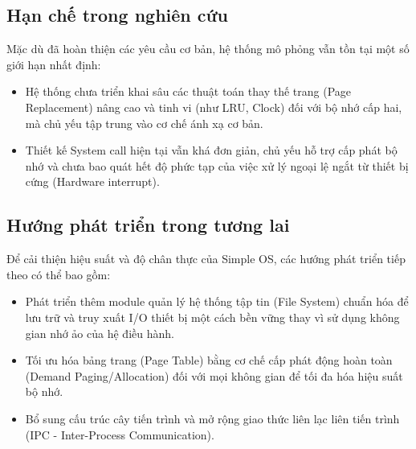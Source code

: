 \documentclass[a4paper]{article}
\begin{document}
\subsection{Hạn chế trong nghiên cứu}
Mặc dù đã hoàn thiện các yêu cầu cơ bản, hệ thống mô phỏng vẫn tồn tại một số giới hạn nhất định:
\begin{itemize}
    \item Hệ thống chưa triển khai sâu các thuật toán thay thế trang (Page Replacement) nâng cao và tinh vi (như LRU, Clock) đối với bộ nhớ cấp hai, mà chủ yếu tập trung vào cơ chế ánh xạ cơ bản.
    \item Thiết kế System call hiện tại vẫn khá đơn giản, chủ yếu hỗ trợ cấp phát bộ nhớ và chưa bao quát hết độ phức tạp của việc xử lý ngoại lệ ngắt từ thiết bị cứng (Hardware interrupt).
\end{itemize}

\subsection{Hướng phát triển trong tương lai}
Để cải thiện hiệu suất và độ chân thực của Simple OS, các hướng phát triển tiếp theo có thể bao gồm:
\begin{itemize}
    \item Phát triển thêm module quản lý hệ thống tập tin (File System) chuẩn hóa để lưu trữ và truy xuất I/O thiết bị một cách bền vững thay vì sử dụng không gian nhớ ảo của hệ điều hành.
    \item Tối ưu hóa bảng trang (Page Table) bằng cơ chế cấp phát động hoàn toàn (Demand Paging/Allocation) đối với mọi không gian để tối đa hóa hiệu suất bộ nhớ.
    \item Bổ sung cấu trúc cây tiến trình và mở rộng giao thức liên lạc liên tiến trình (IPC - Inter-Process Communication).
\end{itemize}
\end{document}
